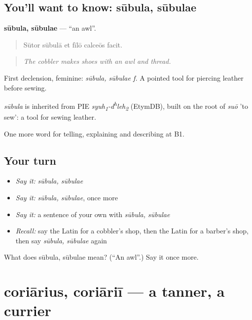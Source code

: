 \subsection*{You'll want to know: sūbula, sūbulae}
\textbf{sūbula, sūbulae} — \textquotedblleft{}an awl\textquotedblright{}.

\begin{quote}
Sūtor sūbulā et fīlō calceōs facit.
\end{quote}

\begin{quote}
\emph{The cobbler makes shoes with an awl and thread.}
\end{quote}

First declension, feminine: \emph{sūbula, sūbulae f.} A pointed tool for piercing leather before sewing.

\begin{cousinweb}
\emph{sūbula} is inherited from PIE \emph{syuh\textsubscript{1}-d\textsuperscript{h}leh\textsubscript{2}} (EtymDB), built on the root of \emph{suō} 'to sew': a tool for sewing leather.
\end{cousinweb}

\begin{grammarlens}[title={What you've built}]
One more word for telling, explaining and describing at B1.
\end{grammarlens}

\subsection*{Your turn}
\begin{itemize}
\raggedright
  \item \emph{Say it:} \emph{sūbula, sūbulae}
  \item \emph{Say it:} \emph{sūbula, sūbulae}, once more
  \item \emph{Say it:} a sentence of your own with \emph{sūbula, sūbulae}
  \item \emph{Recall:} say the Latin for a cobbler's shop, then the Latin for a barber's shop, then say \emph{sūbula, sūbulae} again
\end{itemize}

\begin{tcolorbox}[breakable,colback=teal!4,colframe=teal!35!black,title={Before you move on}]
What does sūbula, sūbulae mean? (\textquotedblleft{}An awl\textquotedblright{}.) Say it once more.
\end{tcolorbox}
\section[coriārius, coriāriī]{coriārius, coriāriī — a tanner, a currier}

